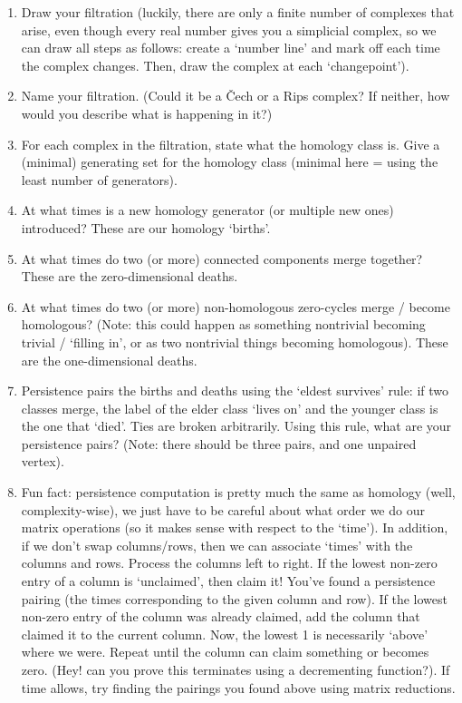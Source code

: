 \documentclass{article}
\begin{document}
\begin{enumerate}[itemsep=2in]
    \item Draw your filtration (luckily, there are only a finite number of
        complexes that arise, even though every real number gives you a
        simplicial complex, so we can draw all steps as follows: create a
        `number line' and mark off each time the complex changes. Then, draw the complex at
        each `changepoint').
    \item Name your filtration. (Could it be a \v{C}ech or a Rips complex? If
        neither, how would you describe what is happening in it?)
    \item For each complex in the filtration, state what the homology class is.
        Give a (minimal) generating set for the homology class (minimal here =
        using the least number of generators).
    \item At what times is a new
        homology generator (or multiple new ones) introduced?
        These are our homology `births'.
    \item At what times do two (or more) connected components merge together?
        These are the zero-dimensional deaths.
    \item At what times do two (or more) non-homologous zero-cycles merge / become homologous?
        (Note: this could happen as something nontrivial becoming trivial /
        `filling in', or as
        two nontrivial things becoming homologous).
        These are the one-dimensional deaths.
    \item Persistence pairs the births and deaths using the `eldest survives'
        rule: if two classes merge, the label of the elder class `lives on' and
        the younger class is the one that `died'. Ties are broken
        arbitrarily. Using this rule, what are your persistence pairs? (Note:
        there should be three pairs, and one unpaired vertex).
    \item Fun fact: persistence computation is pretty much the same as homology
        (well, complexity-wise), we just have to be careful about what order we
        do our matrix operations (so it makes sense with respect to the `time').
        In addition, if we don't
        swap columns/rows, then we can associate `times' with the columns and
        rows. Process the
        columns left to right. If the lowest non-zero entry of a column is
        `unclaimed', then claim it! You've found a persistence pairing (the
        times corresponding to the given column and row). If the lowest non-zero
        entry of the column was already claimed, add the column that claimed it
        to the current column.  Now, the lowest 1 is necessarily `above' where
        we were.  Repeat until the column can claim something or becomes zero.
        (Hey! can you prove this terminates using a decrementing function?). If
        time allows, try
        finding the pairings you found above using matrix reductions.
\end{enumerate}
\end{document}
